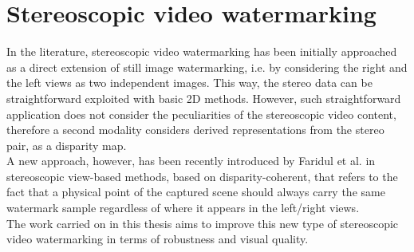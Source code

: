 \section{Stereoscopic video watermarking}

In the literature, stereoscopic video watermarking has been initially approached as a direct extension of still image watermarking, i.e. by considering the right and the left views as two independent images. This way, the stereo data can be straightforward exploited with basic 2D methods. However, such straightforward application does not consider the peculiarities of the stereoscopic video content, therefore a second modality considers derived representations from the stereo pair, as a disparity map.\\ 
A new approach, however, has been recently introduced by Faridul et al. \cite{DOER} in stereoscopic view-based methods, based on disparity-coherent, that refers to the fact that a physical point of the captured scene should always carry the same watermark sample regardless of where it appears in the left/right views.\\
The work carried on in this thesis aims to improve this new type of stereoscopic video watermarking in terms of robustness and visual quality.

